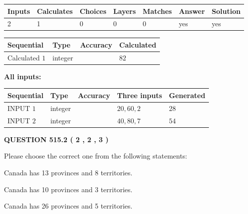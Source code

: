 \documentclass[12pt]{article}
\begin{document}
   
\noindent\begin{tabular}{|l|l|l|l|l|l|l|}
 \hline
Inputs & Calculates & Choices & Layers & Matches & Answer & Solution \\ \hline
 2  & 
 1  & 
 0
  & 
 0  & 
 0  & 
  yes & 
  yes 
  \\ \hline
 \end{tabular}
   
   
   
   
\noindent{}
   
   
  
  
\noindent\begin{tabular}{|l|l|l|l|}
\hline
 Sequential & Type & Accuracy & Calculated \\ 
\hline
 
 
  Calculated $  1 $ & integer &  & 
  $ 82 $ 
 \\  \hline  
 \end{tabular}
   
   
   
   
\noindent\vspace{0.1in}\hspace{-0.08in} {\textbf{\Large{All inputs: }}}
   
   
  
  
\noindent\begin{tabular}{|l|l|l|l|l|}
\hline
 Sequential & Type & Accuracy & Three inputs & Generated \\ 
\hline
 
 
  INPUT $  1 $ & integer &  & $
 20
 , 
 60
 , 
 2
 $ & $ 28 $ 
 \\  \hline  
 
 
  INPUT $  2 $ & integer &  & $
 40
 , 
 80
 , 
 7
 $ & $ 54 $ 
 \\  \hline  
 \end{tabular}
   
   
  
\vspace{0.2in}
  
{\textbf{\Large{QUESTION
515.2 
 ( 2 , 2 , 3 )
}}}
  
  
Please choose the correct one from the following statements:
 
 
Canada has  13 provinces and  8 territories.
 
 
Canada has 10  provinces and 3 territories.
 
 
Canada has  26 provinces and  5 territories.
 
\end{document}
